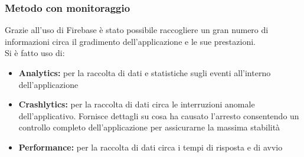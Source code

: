 \documentclass{article}
\begin{document}
		\subsubsection{Metodo con monitoraggio}
		Grazie all’uso di Firebase è stato possibile raccogliere un gran numero di informazioni circa il gradimento dell’applicazione e le sue prestazioni.\\
		Si è fatto uso di:
		\begin{itemize}
			\item \textbf{Analytics:} per la raccolta di dati e statistiche sugli eventi all'interno dell'applicazione
			\item \textbf{Crashlytics:} per la raccolta di dati circa le interruzioni anomale dell'applicativo. Fornisce dettagli su cosa ha causato l'arresto consentendo un controllo completo dell'applicazione per assicurarne la massima stabilità
			\item \textbf{Performance:} per la raccolta di dati circa i tempi di risposta e di avvio
		\end{itemize}
\end{document}
